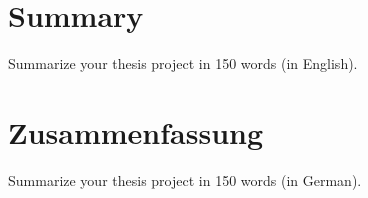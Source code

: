 \section*{Summary}
Summarize your thesis project in 150 words (in English).

\section*{Zusammenfassung}
Summarize your thesis project in 150 words (in German).